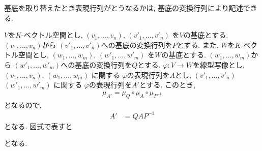 基底を取り替えたとき表現行列がとうなるかは,
基底の変換行列により記述できる.
\begin{prop}
  \label{prop:rep:basis:change}
$V$を$K$-ベクトル空間とし,
$(v_1,\ldots,v_n)$,
$(v'_1,\ldots,v'_n)$
を$V$の基底とする.
$(v_1,\ldots,v_n)$から
$(v'_1,\ldots,v'_n)$への基底の変換行列を$P$とする.
また,
$W$を$K$-ベクトル空間とし,
$(w_1,\ldots,w_m)$,
$(w'_1,\ldots,w'_m)$
を$W$の基底とする.
$(w_1,\ldots,w_m)$から
$(w'_1,\ldots,w'_m)$への基底の変換行列を$Q$とする.
$\varphi\colon V\to W$を線型写像とし,
$(v_1,\ldots,v_n)$,
$(w_1,\ldots,w_m)$
に関する
$\varphi$の表現行列を$A$とし,
$(v'_1,\ldots,v'_n)$
$(w'_1,\ldots,w'_m)$
に関する
$\varphi$の表現行列を$A'$とする.
このとき,
\begin{align*}
\mu_{A'}=\mu_Q\circ \mu_A \circ \mu_{P^{-1}}
\end{align*}
となるので,
\begin{align*}
  A'&=Q A P^{-1}
\end{align*}
となる.
図式で表すと
\begin{center}
\end{center}
となる.
\end{prop}

